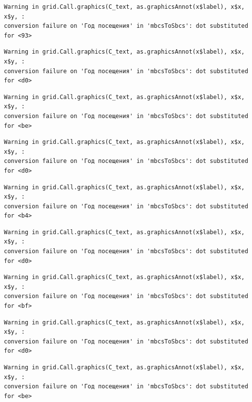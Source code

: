 \documentclass[
  letterpaper,
  DIV=11,
  numbers=noendperiod]{scrartcl}
\begin{document}
\begin{verbatim}
Warning in grid.Call.graphics(C_text, as.graphicsAnnot(x$label), x$x, x$y, :
conversion failure on 'Год посещения' in 'mbcsToSbcs': dot substituted for <93>
\end{verbatim}

\begin{verbatim}
Warning in grid.Call.graphics(C_text, as.graphicsAnnot(x$label), x$x, x$y, :
conversion failure on 'Год посещения' in 'mbcsToSbcs': dot substituted for <d0>
\end{verbatim}

\begin{verbatim}
Warning in grid.Call.graphics(C_text, as.graphicsAnnot(x$label), x$x, x$y, :
conversion failure on 'Год посещения' in 'mbcsToSbcs': dot substituted for <be>
\end{verbatim}

\begin{verbatim}
Warning in grid.Call.graphics(C_text, as.graphicsAnnot(x$label), x$x, x$y, :
conversion failure on 'Год посещения' in 'mbcsToSbcs': dot substituted for <d0>
\end{verbatim}

\begin{verbatim}
Warning in grid.Call.graphics(C_text, as.graphicsAnnot(x$label), x$x, x$y, :
conversion failure on 'Год посещения' in 'mbcsToSbcs': dot substituted for <b4>
\end{verbatim}

\begin{verbatim}
Warning in grid.Call.graphics(C_text, as.graphicsAnnot(x$label), x$x, x$y, :
conversion failure on 'Год посещения' in 'mbcsToSbcs': dot substituted for <d0>
\end{verbatim}

\begin{verbatim}
Warning in grid.Call.graphics(C_text, as.graphicsAnnot(x$label), x$x, x$y, :
conversion failure on 'Год посещения' in 'mbcsToSbcs': dot substituted for <bf>
\end{verbatim}

\begin{verbatim}
Warning in grid.Call.graphics(C_text, as.graphicsAnnot(x$label), x$x, x$y, :
conversion failure on 'Год посещения' in 'mbcsToSbcs': dot substituted for <d0>
\end{verbatim}

\begin{verbatim}
Warning in grid.Call.graphics(C_text, as.graphicsAnnot(x$label), x$x, x$y, :
conversion failure on 'Год посещения' in 'mbcsToSbcs': dot substituted for <be>
\end{verbatim}
\end{document}
